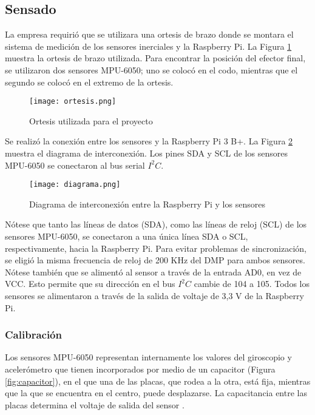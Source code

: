 \subsection{Sensado}

La empresa requirió que se utilizara una ortesis de brazo donde se montara el sistema de medición de los sensores inerciales y la Raspberry Pi. La Figura \ref{fig:ortesis} muestra la ortesis de brazo utilizada. Para encontrar la posición del efector final, se utilizaron dos sensores MPU-6050; uno se colocó en el codo, mientras que el segundo se colocó en el extremo de la ortesis.

\begin{figure}[htb]
	\centering
	{\texttt{[image: ortesis.png]}}
	\caption{Ortesis utilizada para el proyecto}
	\label{fig:ortesis}
\end{figure}

Se realizó la conexión entre los sensores y la Raspberry Pi 3 B+. La Figura \ref{fig:diagrama} muestra el diagrama de interconexión. Los pines SDA y SCL de los sensores MPU-6050 se conectaron al bus serial $I^2C$.

\begin{figure}[htb]
	\centering
	\texttt{[image: diagrama.png]}
	\caption{Diagrama de interconexión entre la Raspberry Pi y los sensores}
	\label{fig:diagrama}
\end{figure}

Nótese que tanto las líneas de datos (SDA), como las líneas de reloj (SCL) de los sensores MPU-6050, se conectaron a una única línea SDA o SCL, respectivamente, hacia la Raspberry Pi. Para evitar problemas de sincronización, se eligió la misma frecuencia de reloj de 200 KHz del DMP para ambos sensores. Nótese también que se alimentó al sensor a través de la entrada AD0, en vez de VCC. Esto permite que su dirección en el bus $I^2C$ cambie de 104 a 105. Todos los sensores se alimentaron a través de la salida de voltaje de 3,3 V de la Raspberry Pi.

\subsubsection{Calibración}

Los sensores MPU-6050 representan internamente los valores del giroscopio y acelerómetro que tienen incorporados por medio de un capacitor (Figura \ref{fig:capacitor}), en el que una de las placas, que rodea a la otra, está fija, mientras que la que se encuentra en el centro, puede desplazarse. La capacitancia entre las placas determina el voltaje de salida del sensor \cite{MEMS}.

